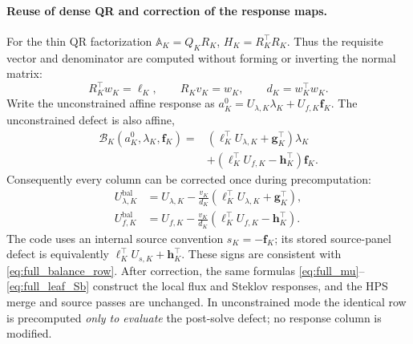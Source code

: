 \documentclass[11pt]{article}
\begin{document}
\paragraph{Reuse of dense QR and correction of the response maps.}
For the thin QR factorization $\mathbb A_K=Q_KR_K$,
$H_K=R_K^\top R_K$.  Thus the requisite vector and denominator are
computed without forming or inverting the normal matrix:
\begin{equation}\label{eq:full_balance_QR_triangular}
 R_K^\top w_K=\bm\ell_K,\qquad
 R_Kv_K=w_K,\qquad
 d_K=w_K^\top w_K.
\end{equation}
Write the unconstrained affine response as
$a_K^0=U_{\lambda,K}\lambda_K+U_{f,K}\bm f_K$.
The unconstrained defect is also affine,
\begin{align}\label{eq:full_balance_map_defects}
 \mathcal B_K(a_K^0,\lambda_K,\bm f_K)
 ={}& (\bm\ell_K^\top U_{\lambda,K}+\bm g_K^\top)\lambda_K
 \nonumber\\
 &+(\bm\ell_K^\top U_{f,K}-\bm h_K^\top)\bm f_K.
\end{align}
Consequently every column can be corrected once during precomputation:
\begin{align}\label{eq:full_balance_map_update}
 U_{\lambda,K}^{\mathrm{bal}}
 &=U_{\lambda,K}-\frac{v_K}{d_K}
   (\bm\ell_K^\top U_{\lambda,K}+\bm g_K^\top),\\
 U_{f,K}^{\mathrm{bal}}
 &=U_{f,K}-\frac{v_K}{d_K}
   (\bm\ell_K^\top U_{f,K}-\bm h_K^\top).
\end{align}
The code uses an internal source convention $s_K=-\bm f_K$;
its stored source-panel defect is equivalently
$\bm\ell_K^\top U_{s,K}+\bm h_K^\top$.  These signs are consistent
with \eqref{eq:full_balance_row}.  After correction, the same formulas
\eqref{eq:full_mu}--\eqref{eq:full_leaf_Sb} construct the local flux
and Steklov responses, and the HPS merge and source passes are
unchanged.  In unconstrained mode the identical row is precomputed
\emph{only to evaluate} the post-solve defect; no response column is
modified.
\end{document}
